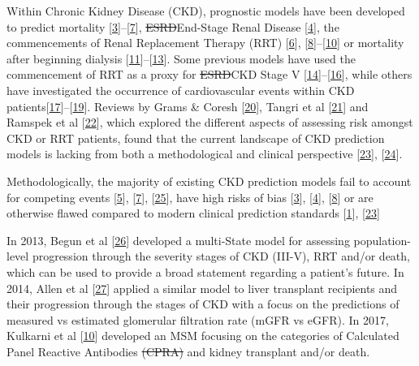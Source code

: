 \documentclass[
]{article}
\begin{document}
Within Chronic Kidney Disease (CKD), prognostic models have been developed to predict mortality {[}\protect\hyperlink{ref-johnson_predicting_2007}{3}{]}--{[}\protect\hyperlink{ref-wick_clinical_2017}{7}{]}, \sout{ESRD}End-Stage Renal Disease {[}\protect\hyperlink{ref-landray_prediction_2010}{4}{]}, the commencements of Renal Replacement Therapy (RRT) {[}\protect\hyperlink{ref-marks_looking_2015}{6}{]}, {[}\protect\hyperlink{ref-johnson_predicting_2008}{8}{]}--{[}\protect\hyperlink{ref-kulkarni_transition_2017}{10}{]} or mortality after beginning dialysis {[}\protect\hyperlink{ref-floege_development_2015}{11}{]}--{[}\protect\hyperlink{ref-cao_predicting_2015}{13}{]}. Some previous models have used the commencement of RRT as a proxy for \sout{ESRD}CKD Stage V {[}\protect\hyperlink{ref-tangri_predictive_2011}{14}{]}--{[}\protect\hyperlink{ref-tangri_dynamic_2017}{16}{]}, while others have investigated the occurrence of cardiovascular events within CKD patients{[}\protect\hyperlink{ref-shlipak_cardiovascular_2005}{17}{]}--{[}\protect\hyperlink{ref-mcmurray_predictors_2011}{19}{]}. Reviews by Grams \& Coresh {[}\protect\hyperlink{ref-grams_assessing_2013}{20}{]}, Tangri et al {[}\protect\hyperlink{ref-tangri_risk_2013}{21}{]} and Ramspek et al {[}\protect\hyperlink{ref-ramspek_prediction_2017}{22}{]}, which explored the different aspects of assessing risk amongst CKD or RRT patients, found that the current landscape of CKD prediction models is lacking from both a methodological and clinical perspective {[}\protect\hyperlink{ref-collins_transparent_2015}{23}{]}, {[}\protect\hyperlink{ref-bouwmeester_reporting_2012-1}{24}{]}.

Methodologically, the majority of existing CKD prediction models fail to account for competing events {[}\protect\hyperlink{ref-bansal_development_2015}{5}{]}, {[}\protect\hyperlink{ref-wick_clinical_2017}{7}{]}, {[}\protect\hyperlink{ref-perotte_risk_2015}{25}{]}, have high risks of bias {[}\protect\hyperlink{ref-johnson_predicting_2007}{3}{]}, {[}\protect\hyperlink{ref-landray_prediction_2010}{4}{]}, {[}\protect\hyperlink{ref-johnson_predicting_2008}{8}{]} or are otherwise flawed compared to modern clinical prediction standards {[}\protect\hyperlink{ref-steyerberg_prognosis_2013}{1}{]}, {[}\protect\hyperlink{ref-collins_transparent_2015}{23}{]}

In 2013, Begun et al {[}\protect\hyperlink{ref-begun_identification_2013}{26}{]} developed a multi-State model for assessing population-level progression through the severity stages of CKD (III-V), RRT and/or death, which can be used to provide a broad statement regarding a patient's future. In 2014, Allen et al {[}\protect\hyperlink{ref-allen_chronic_2014}{27}{]} applied a similar model to liver transplant recipients and their progression through the stages of CKD with a focus on the predictions of measured vs estimated glomerular filtration rate (mGFR vs eGFR). In 2017, Kulkarni et al {[}\protect\hyperlink{ref-kulkarni_transition_2017}{10}{]} developed an MSM focusing on the categories of Calculated Panel Reactive Antibodies \sout{(CPRA)} and kidney transplant and/or death.
\end{document}
